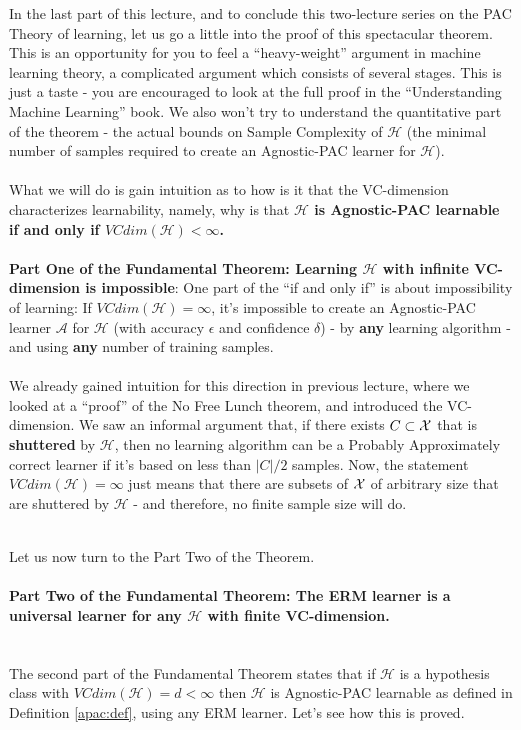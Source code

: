 \documentclass[11pt]{article}
\newcommand{\Ac}{\mathcal{A}}
\newcommand{\Hc}{\mathcal{H}}
\begin{document}
In the last part of this lecture, and to conclude this two-lecture series on the
PAC Theory of learning, let us go a little into the proof of this spectacular
theorem. 
This is an opportunity for you to feel a ``heavy-weight'' argument in machine
learning theory, a complicated argument which consists of several stages.
This is just a taste - you are encouraged to look at the full proof in the  ``Understanding Machine
Learning'' book. We also won't try to understand the quantitative part of the
theorem - the actual bounds on Sample Complexity of $\Hc$ (the minimal number of
samples required to create an Agnostic-PAC learner for $\Hc$). 
\\~\\
What we will do is gain intuition as to how is it that the
VC-dimension characterizes learnability, namely, why is that 
{\bf $\Hc$ is Agnostic-PAC learnable if and only if $VCdim(\Hc)<\infty$. }
\\~\\
{\bf Part One of the Fundamental Theorem: Learning $\Hc$ with infinite
VC-dimension is impossible}: One part of the ``if and only if'' is about
impossibility of learning: If $VCdim(\Hc)=\infty$, it's impossible
to create an Agnostic-PAC learner $\Ac$ for $\Hc$ (with accuracy $\epsilon$ and
confidence $\delta$) - by {\bf any} learning algorithm - and using {\bf any}
number of training samples.
\\~\\
We already gained intuition for this direction in previous lecture, where we
looked at a ``proof'' of the No Free Lunch theorem, and introduced the
VC-dimension. We saw an informal argument that, if there exists $C\subset\mathcal{X}$ that is {\bf shuttered}
by $\Hc$, then no learning algorithm can be a Probably Approximately correct
learner if it's based on less than $|C|/2$ samples. Now, the statement
$VCdim(\Hc)=\infty$ just means that there are subsets of $\mathcal{X}$ of arbitrary size
that are shuttered by $\Hc$ - and therefore, no finite sample size will do.


~\\Let us now turn to the Part Two of the Theorem.
%
\paragraph{Part Two of the Fundamental Theorem: The ERM learner is a universal
learner for any $\Hc$ with finite VC-dimension.}
~\\
The second part of the Fundamental Theorem states that if
    $\Hc$ is a hypothesis class with $VCdim(\Hc)=d<\infty$ then $\Hc$ is
    Agnostic-PAC learnable as defined in Definition \ref{apac:def}, using any
    ERM learner. Let's see how this is proved.
\end{document}

